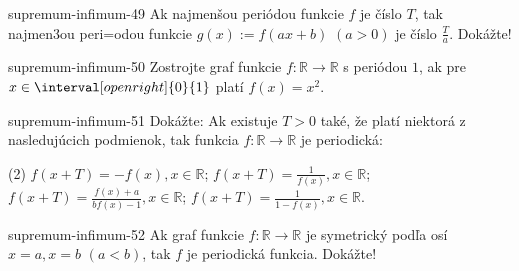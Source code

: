 \begin{defproblem}{supremum-infimum-49}
Ak najmenšou periódou funkcie $f$ je číslo $T$, tak najmen3ou peri=odou funkcie
$g(x):=f(ax+b)$ $(a>0)$ je číslo $\frac{T}{a}$. Dokážte!
\end{defproblem}

\begin{defproblem}{supremum-infimum-50}
Zostrojte graf funkcie $f:\mathbb{R} \rightarrow \mathbb{R}$ s periódou $1$, ak
pre $x \in \interval[open right]{0}{1}$ platí $f(x) = x^2$.
\end{defproblem}

\begin{defproblem}{supremum-infimum-51}
Dokážte: Ak existuje $T>0$ také, že platí niektorá z nasledujúcich podmienok,
tak funkcia $f:\mathbb{R} \rightarrow \mathbb{R}$ je periodická:
\begin{tasks}(2)
  \task $f(x+T)=-f(x),x\in\mathbb{R}$;
  \task $f(x+T)=\frac{1}{f(x)},x\in\mathbb{R}$;
  \task $f(x+T)=\frac{f(x)+a}{bf(x)-1},x\in\mathbb{R}$;
  \task $f(x+T)=\frac{1}{1-f(x)},x\in\mathbb{R}$.
\end{tasks}
\end{defproblem}

\begin{defproblem}{supremum-infimum-52}
Ak graf funkcie $f:\mathbb{R} \rightarrow \mathbb{R}$ je symetrický podľa osí
$x = a,x = b$ $(a < b)$, tak $f$ je periodická funkcia. Dokážte!
\end{defproblem}

